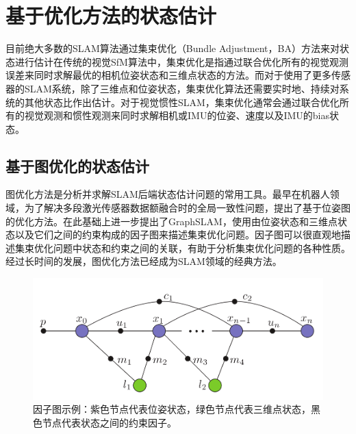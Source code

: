 \section{基于优化方法的状态估计}

目前绝大多数的SLAM算法通过集束优化\citep{triggs1999bundle}（Bundle Adjustment，BA）方法来对状态进行估计在传统的视觉SfM算法中，集束优化是指通过联合优化所有的视觉观测误差来同时求解最优的相机位姿状态和三维点状态的方法。而对于使用了更多传感器的SLAM系统，除了三维点和位姿状态，集束优化算法还需要实时地、持续对系统的其他状态比作出估计。对于视觉惯性SLAM，集束优化通常会通过联合优化所有的视觉观测和惯性观测来同时求解相机或IMU的位姿、速度以及IMU的bias状态。

\subsection{基于图优化的状态估计}

图优化方法是分析并求解SLAM后端状态估计问题的常用工具。最早在机器人领域，为了解决多段激光传感器数据额融合时的全局一致性问题，\citep{lu1997globally,lu1997robot}提出了基于位姿图的优化方法。\citeauthor{thrun2006graph}在此基础上进一步提出了GraphSLAM\citep{thrun2006graph}，使用由位姿状态和三维点状态以及它们之间的约束构成的因子图来描述集束优化问题。因子图可以很直观地描述集束优化问题中状态和约束之间的关联，有助于分析集束优化问题的各种性质。经过长时间的发展，图优化方法已经成为SLAM领域的经典方法。

\begin{figure}[htb]
    \centering
    \includegraphics[width=.8\textwidth]{figs/isam_factor_graph.png}
    \caption{因子图示例\citep{kaess2012isam2}：紫色节点代表位姿状态，绿色节点代表三维点状态，黑色节点代表状态之间的约束因子。}
    \label{fig:isam_factor_graph}
\end{figure}


